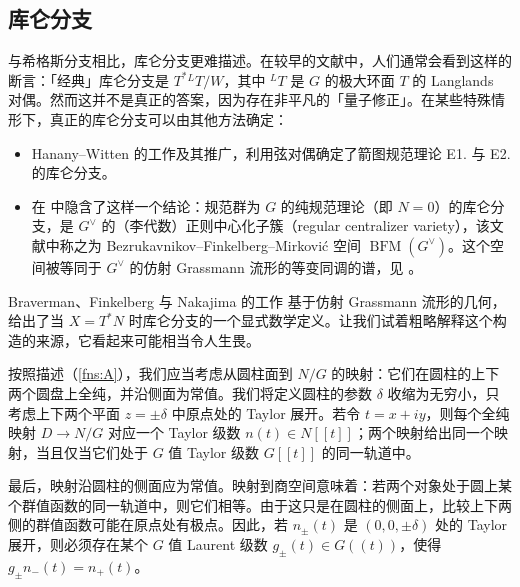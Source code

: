 \subsection{库仑分支}
与希格斯分支相比，库仑分支更难描述。在较早的文献中，人们通常会看到这样的断言：「经典」库仑分支是 $T^*{}^LT/W$，其中 ${}^LT$ 是 $G$ 的极大环面 $T$ 的 Langlands 对偶。然而这并不是真正的答案，因为存在非平凡的「量子修正」。在某些特殊情形下，真正的库仑分支可以由其他方法确定：
\begin{itemize}
	\item Hanany--Witten \cite{hananyTypeIIB1997} 的工作及其推广，利用弦对偶确定了箭图规范理论 E1. 与 E2. 的库仑分支。
	\item 在 \cite{telemanGaugeTheory2014} 中隐含了这样一个结论：规范群为 $G$ 的纯规范理论（即 $N=0$）的库仑分支，是 $G^{\vee}$ 的（李代数）正则中心化子簇（regular centralizer variety），该文献中称之为 Bezrukavnikov--Finkelberg--Mirkovi\'c 空间 $\operatorname{BFM}(G^{\vee})$。这个空间被等同于 $G^{\vee}$ 的仿射 Grassmann 流形的等变同调的谱，见 \cite{bezrukavnikovEquivariantHomology2005}。
\end{itemize}


Braverman、Finkelberg 与 Nakajima 的工作 \cite{BFN} 基于仿射 Grassmann 流形的几何，给出了当 $X=T^*N$ 时库仑分支的一个显式数学定义。让我们试着粗略解释这个构造的来源，它看起来可能相当令人生畏。

按照描述（\ref{fns:A}），我们应当考虑从圆柱面到 $N/G$ 的映射：它们在圆柱的上下两个圆盘上全纯，并沿侧面为常值。我们将定义圆柱的参数 $\delta$ 收缩为无穷小，只考虑上下两个平面 $z=\pm \delta$ 中原点处的 Taylor 展开。若令 $t = x + iy$，则每个全纯映射 $D\to N/G$ 对应一个 Taylor 级数 $n(t)\in N[[t]]$；两个映射给出同一个映射，当且仅当它们处于 $G$ 值 Taylor 级数 $G[[t]]$ 的同一轨道中。

最后，映射沿圆柱的侧面应为常值。映射到商空间意味着：若两个对象处于圆上某个群值函数的同一轨道中，则它们相等。由于这只是在圆柱的侧面上，比较上下两侧的群值函数可能在原点处有极点。因此，若 $n_\pm(t)$ 是 $(0,0,\pm \delta)$ 处的 Taylor 展开，则必须存在某个 $G$ 值 Laurent 级数 $g_{\pm}(t)\in G((t))$，使得 $g_{\pm} n_{-}(t)=n_+(t)$。

